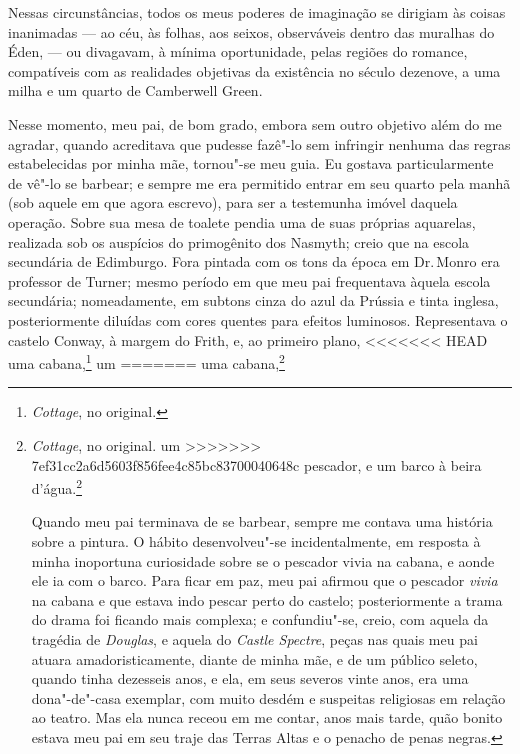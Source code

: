 {{{{{{{{{{{{Nessas circunstâncias, todos os meus poderes de imaginação se dirigiam
às coisas inanimadas --- ao céu, às folhas, aos seixos, observáveis
dentro das muralhas do Éden, --- ou divagavam, à mínima oportunidade,
pelas regiões do romance, compatíveis com as realidades objetivas da
existência no século dezenove, a uma milha e um quarto de Camberwell
Green.

Nesse momento, meu pai, de bom grado, embora sem outro objetivo além
do me agradar, quando acreditava que pudesse fazê"-lo sem infringir
nenhuma das regras estabelecidas por minha mãe, tornou"-se meu guia. Eu
gostava particularmente de vê"-lo se barbear; e sempre me era permitido
entrar em seu quarto pela manhã (sob aquele em que agora escrevo), para
ser a testemunha imóvel daquela operação. Sobre sua mesa de toalete
pendia uma de suas próprias aquarelas, realizada sob os auspícios do
primogênito dos Nasmyth; creio que na escola secundária de Edimburgo.
Fora pintada com os tons da época em Dr.\,Monro era professor de Turner;
mesmo período em que meu pai frequentava àquela escola secundária;
nomeadamente, em subtons cinza do azul da Prússia e tinta inglesa,
posteriormente diluídas com cores quentes para efeitos luminosos.
Representava o castelo Conway, à margem do Frith, e, ao primeiro plano,
<<<<<<< HEAD
uma cabana,\footnote{\textit{Cottage}, no original.} um
=======
uma cabana,\footnote{\textit{Cottage}, no original.  um
>>>>>>> 7ef31cc2a6d5603f856fee4c85bc83700040648c
pescador, e um barco à beira d'água.\footnote{A aquarela ainda está sob a
  cornija da lareira de meu quarto, em Brantwood. {[}\textsc{n.\,a.}{]}}

Quando meu pai terminava de se barbear, sempre me contava uma
história sobre a pintura. O hábito desenvolveu"-se incidentalmente, em
resposta à minha inoportuna curiosidade sobre se o pescador vivia na
cabana, e aonde ele ia com o barco. Para ficar em paz, meu pai afirmou
que o pescador \textit{vivia} na cabana e que estava indo pescar perto do
castelo; posteriormente a trama do drama foi ficando mais complexa; e
confundiu"-se, creio, com aquela da tragédia de \textit{Douglas}, e aquela
do \textit{Castle Spectre}, peças nas quais meu pai atuara
amadoristicamente, diante de minha mãe, e de um público seleto, quando
tinha dezesseis anos, e ela, em seus severos vinte anos, era uma
dona"-de"-casa exemplar, com muito desdém e suspeitas religiosas em
relação ao teatro. Mas ela nunca receou em me contar, anos mais tarde,
quão bonito estava meu pai em seu traje das Terras Altas e o penacho de
penas negras.

}}}}}}}}}}}}}

